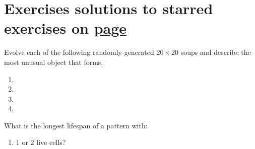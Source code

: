 \section*{Exercises \hfill \normalfont\textsf{\small solutions to starred exercises on \hyperlink{solutions_early_life}{page \pageref{solutions_early_life}}}}
\label{sec:early_life_exercises}
\vspace*{-0.4cm}\hrulefill\vspace*{-0.3cm}\footnotesize\begin{multicols}{2}\vspace*{-0.4cm}\raggedcolumns{}
	\setlength{\parskip}{0pt}
	
	\begin{problemstar}\label{exer:natural_switch_engine} 
		Evolve each of the following randomly-generated $20 \times 20$ soups and describe the most unusual object that forms.\vspace*{-0.25cm}
		
		\begin{multicols}{2}
			\begin{enumerate}
				\item[\bf\color{ocre}(a)] 
				
				\item[\bf\color{ocre}(c)] 
				
				\item[\bf\color{ocre}(b)] 
				
				\item[\bf\color{ocre}(d)] 
			\end{enumerate}
		\end{multicols}
	\end{problemstar}
	
	
	\mfilbreak
	
	
	\begin{problem}\label{exer:4_cell_methuselahs}
		What is the longest lifespan of a pattern with:\smallskip
		
		\begin{enumerate}[label=\bf\color{ocre}(\alph*)]
			\item {} $1$ or $2$ live cells?
			

\end{enumerate}
\end{problem}
\end{multicols}
